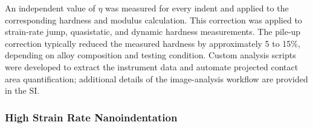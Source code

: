 An independent value of $\eta$ was measured for every indent and applied to the corresponding hardness and modulus calculation. This correction was applied to strain-rate jump, quasistatic, and dynamic hardness measurements. The pile-up correction typically reduced the measured hardness by approximately 5 to 15\%, depending on alloy composition and testing condition. Custom analysis scripts were developed to extract the instrument data and automate projected contact area quantification; additional details of the image-analysis workflow are provided in the SI.



\subsubsection{High Strain Rate Nanoindentation}





